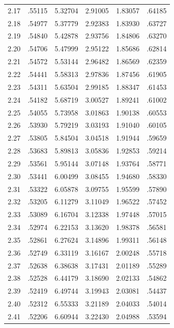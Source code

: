 \begin{minipage}{0.47\textwidth}
\begin{tabular}{c|c|c|c|c|c}
        2.17 & .55115 & 5.32704 & 2.91005 & 1.83057 & .64185 \\
        2.18 & .54977 & 5.37779 & 2.92383 & 1.83930 & .63727 \\
        2.19 & .54840 & 5.42878 & 2.93756 & 1.84806 & .63270 \\
        2.20 & .54706 & 5.47999 & 2.95122 & 1.85686 & .62814 \\
        2.21 & .54572 & 5.53144 & 2.96482 & 1.86569 & .62359 \\
        2.22 & .54441 & 5.58313 & 2.97836 & 1.87456 & .61905 \\
        2.23 & .54311 & 5.63504 & 2.99185 & 1.88347 & .61453 \\
        2.24 & .54182 & 5.68719 & 3.00527 & 1.89241 & .61002 \\
        2.25 & .54055 & 5.73958 & 3.01863 & 1.90138 & .60553 \\
        2.26 & .53930 & 5.79219 & 3.03193 & 1.91040 & .60105 \\
        2.27 & .53805 & 5.84504 & 3.04518 & 1.91944 & .59659 \\
        2.28 & .53683 & 5.89813 & 3.05836 & 1.92853 & .59214 \\
        2.29 & .53561 & 5.95144 & 3.07148 & 1.93764 & .58771 \\
        2.30 & .53441 & 6.00499 & 3.08455 & 1.94680 & .58330 \\
        2.31 & .53322 & 6.05878 & 3.09755 & 1.95599 & .57890 \\
        2.32 & .53205 & 6.11279 & 3.11049 & 1.96522 & .57452 \\
        2.33 & .53089 & 6.16704 & 3.12338 & 1.97448 & .57015 \\
        2.34 & .52974 & 6.22153 & 3.13620 & 1.98378 & .56581 \\
        2.35 & .52861 & 6.27624 & 3.14896 & 1.99311 & .56148 \\  \arrayrulecolor{Green}\hline\arrayrulecolor{black}
        2.36 & .52749 & 6.33119 & 3.16167 & 2.00248 & .55718 \\
        2.37 & .52638 & 6.38638 & 3.17431 & 2.01189 & .55289 \\
        2.38 & .52528 & 6.44179 & 3.18690 & 2.02133 & .54862 \\
        2.39 & .52419 & 6.49744 & 3.19943 & 2.03081 & .54437 \\
        2.40 & .52312 & 6.55333 & 3.21189 & 2.04033 & .54014 \\
        2.41 & .52206 & 6.60944 & 3.22430 & 2.04988 & .53594 \\

\end{tabular}
\end{minipage}
